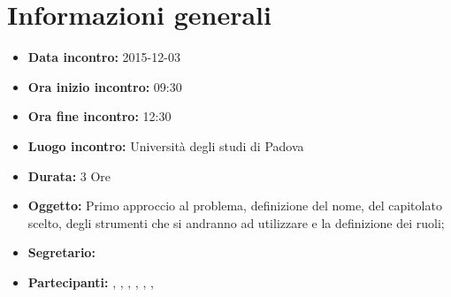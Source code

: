 \newpage
\chapter{Informazioni generali}
\begin{itemize}
\item \textbf{Data incontro:} 2015-12-03
\item \textbf{Ora inizio incontro:} 09:30
\item \textbf{Ora fine incontro:} 12:30
\item \textbf{Luogo incontro:} Università degli studi di Padova
\item \textbf{Durata:} 3 Ore
\item \textbf{Oggetto:} Primo approccio al problema, definizione del nome, del capitolato scelto, degli strumenti che si andranno ad utilizzare e la definizione dei ruoli;
\item \textbf{Segretario:} \AF
\item \textbf{Partecipanti:} \AF, \FB, \GN, \GR, \MV, \MP, \SM

\end{itemize}
